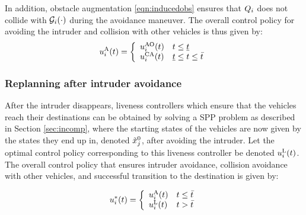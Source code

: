 In addition, obstacle augmentation \eqref{eqn:inducedobs} ensures that $Q_i$ does not collide with $\mathcal{G}_i(\cdot)$ during the avoidance maneuver. %
The overall control policy for avoiding the intruder and collision with other vehicles is thus given by:
\begin{equation*}
{u^{\text{A}}_{i}}(t) = 
\left \{ 
\begin{array}{ll}
{u^{\text{AO}}_{i}}(t) & t \leq \underline{t}\\
{u^{\text{CA}}_{i}}(t) & \underline{t}\leq t \leq \bar{t}
\end{array}
\right.
\end{equation*}

\subsubsection{Replanning after intruder avoidance\label{sec:replan_method1}} 
After the intruder disappears, liveness controllers which ensure that the vehicles reach their destinations can be obtained by solving a SPP problem as described in Section \ref{sec:incomp}, where the starting states of the vehicles are now given by the states they end up in, denoted $\tilde{x}_j^0$, after avoiding the intruder. Let the optimal control policy corresponding to this liveness controller be denoted ${u^{\text{L}}_{i}}(t)$. The overall control policy that ensures intruder avoidance, collision avoidance with other vehicles, and successful transition to the destination is given by:

\begin{equation*}
u_i^*(t) = 
\left \{ 
\begin{array}{ll}
{u^{\text{A}}_{i}}(t) & t \leq \bar{t}\\
{u^{\text{L}}_{i}}(t) & t > \bar{t}
\end{array}
\right.
\end{equation*}


